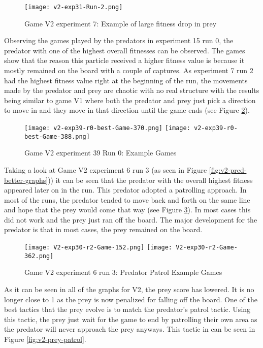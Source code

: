 \begin{figure}
  \centering
  \texttt{[image: v2-exp31-Run-2.png]}
  \caption{Game V2 experiment 7: Example of large fitness drop in prey}
  \label{fig:v2-prey-large-drop}
\end{figure}

Observing the games played by the predators in experiment 15 run 0, the predator with one of the highest overall fitnesses can be observed. The games show that the reason this particle received a higher fitness value is because it mostly remained on the board with a couple of captures. As experiment 7 run 2 had the highest fitness value right at the beginning of the run, the movements made by the predator and prey are chaotic with no real structure with the results being similar to game V1 where both the predator and prey just pick a direction to move in and they move in that direction until the game ends (see Figure \ref{fig:v2-exp39-best}). 

\begin{figure}
  \centering
  \texttt{[image: v2-exp39-r0-best-Game-370.png]}  \texttt{[image: v2-exp39-r0-best-Game-388.png]}
  \caption{Game V2 experiment 39 Run 0: Example Games}
  \label{fig:v2-exp39-best}
\end{figure}

Taking a look at Game V2 experiment 6 run 3 (as seen in Figure \ref{fig:v2-pred-better-graphs})) it can be seen that the predator with the overall highest fitness appeared later on in the run. This predator adopted a patrolling approach. In most of the runs, the predator tended to move back and forth on the same line and hope that the prey would come that way (see Figure \ref{fig:v2-pred-patrol}). In most cases this did not work and the prey just ran off the board. The major development for the predator is that in most cases, the prey remained on the board.

\begin{figure}
  \centering
  \texttt{[image: V2-exp30-r2-Game-152.png]}  \texttt{[image: V2-exp30-r2-Game-362.png]}
  \caption{Game V2 experiment 6 run 3: Predator Patrol Example Games}
  \label{fig:v2-pred-patrol}
\end{figure}

As it can be seen in all of the graphs for V2, the prey score has lowered. It is no longer close to 1 as the prey is now penalized for falling off the board. One of the best tactics that the prey evolve is to match the predator's patrol tactic. Using this tactic, the prey just wait for the game to end by patrolling their own area as the predator will never approach the prey anyways. This tactic in can be seen in Figure \ref{fig:v2-prey-patrol}.

